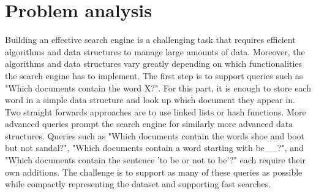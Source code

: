 \section{Problem analysis}

Building an effective search engine is a challenging task that requires efficient algorithms and data structures to manage large amounts of data. Moreover, the algorithms and data structures vary greatly depending on which functionalities the search engine has to implement. The first step is to support queries such as "Which documents contain the word X?". For this part, it is enough to store each word in a simple data structure and look up which document they appear in. Two straight forwards approaches are to use linked lists or hash functions. More advanced queries prompt the search engine for similarly more advanced data structures. Queries such as "Which documents contain the words shoe and boot but not sandal?", "Which documents contain a word starting with be\_\_?", and "Which documents contain the sentence 'to be or not to be'?" each require their own additions. The challenge is to support as many of these queries as possible while compactly representing the dataset and supporting fast searches. 



